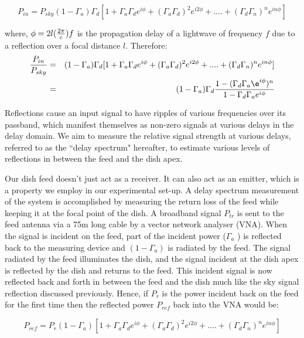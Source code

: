 \documentclass[12pt,preprint]{aastex}
\begin{document}
\begin{equation}
P_{in} =  P_{sky}(1-\Gamma_{a})\Gamma_{d} [1+ \Gamma_{a}\Gamma_{d} e^{i\phi}+ (\Gamma_{a}\Gamma_{d})^2e^{i2\phi}+ ....+ (\Gamma_{d}\Gamma_{n})^{n}e^{in\phi}]
\end{equation}

where, $\phi = 2l({2\pi \over c})f$ is the propagation delay of a lightwave of frequency $f$ due to a reflection over a focal distance $l$. 
Therefore:
\begin{eqnarray}
{P_{in} \over P_{sky} } & = & (1-\Gamma_{a})\Gamma_{d} [1+ \Gamma_{a}\Gamma_{d} e^{i\phi}+ (\Gamma_{a}\Gamma_{d})^2e^{i2\phi}+ ....+ (\Gamma_{d}\Gamma_{n})^{n}e^{in\phi}] \nonumber\\
      & = & (1-\Gamma_{a})\Gamma_{d} {1-(\Gamma_{d}\Gamma_{a}\e^{i\phi})^{n} \over 1-\Gamma_{d} \Gamma_{a} e^{i\phi} } 
\end{eqnarray}

Reflections cause an input signal to have ripples of various frequencies over its passband, which manifest themselves as non-zero signals at various delays in the delay domain. We aim to measure the relative signal strength at various delays, referred to as the ``delay spectrum" hereafter, to estimate various levels of reflections in between the feed and the dish apex.
 
Our dish feed doesn't just act as a receiver. It can also act as an emitter, which is a property we employ in our experimental set-up. A delay spectrum measurement of the system is accomplished by measuring the return loss of the feed while keeping it at the focal point of the dish. A broadband signal $P_{tr}$ is sent to the feed antenna via a 75m long cable by a vector network analyser (VNA). When the signal is incident on the feed, part of the incident power ($\Gamma_{a}$ ) is reflected back to the measuring device and $(1-\Gamma_{a})$ is radiated by the feed. The signal radiated by the feed illuminates the dish, and the signal incident at the dish apex is reflected by the dish and returns to the feed. This incident signal is now reflected back and forth in between the feed and the dish much like the sky signal reflection discussed previously. Hence, if $P_{r}$ is the power incident back on the feed for the first time then the reflected power $P_{ref}$ back into the VNA would be:

\begin{equation}
P_{ref} =  P_{r}(1-\Gamma_{a}) [1+ \Gamma_{a}\Gamma_{d} e^{i\phi}+ (\Gamma_{a}\Gamma_{d})^2e^{i2\phi}+ ....+ (\Gamma_{d}\Gamma_{n})^{n}e^{in\phi}]
\end{equation}
 
\end{document}
